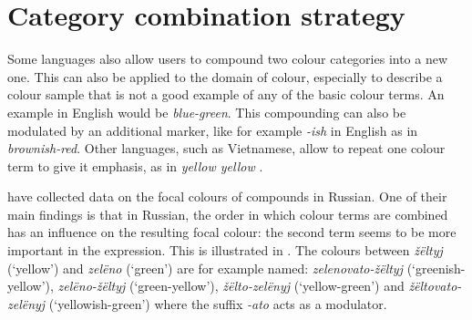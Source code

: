 \chapter{Category combination strategy}
\label{s:category-combination-strategy}

Some languages also allow users to compound two colour categories into
a new one. This can also be applied to the domain of colour,
especially to describe a colour sample that is not a good example of
any of the basic colour terms.  An example in English would be
\textit{blue-green}. This compounding can also be modulated by an
additional marker, like for example \textit{-ish} in English as in
\textit{brownish-red}. Other languages, such as Vietnamese, allow to repeat
one colour term to give it emphasis, as in \textit{yellow yellow}
\citep{alvarado02modifying}.

\cite{safuanova07russian} have collected data on the focal colours of
compounds in Russian. One of their main findings is that in Russian,
the order in which colour terms are combined has an influence on the
resulting focal colour: the second term seems to be more important in
the expression. This is illustrated in . The
colours between \textit{\v z\"eltyj} (`yellow') and \textit{zel\"eno} (`green') are
for example named: \textit{zelenovato-\v z\"eltyj} (`greenish-yellow'),
\textit{zel\"eno-\v z\"eltyj} (`green-yellow'), \textit{\v z\"elto-zel\"enyj}
(`yellow-green') and \textit{\v z\"eltovato-zel\"enyj} (`yellowish-green')
where the suffix \textit{-ato} acts as a modulator.

